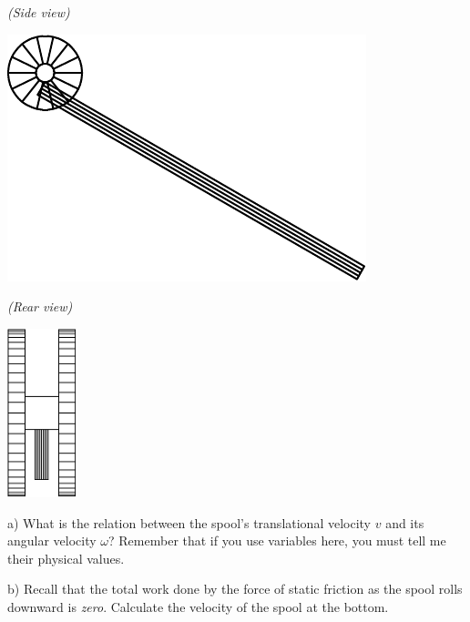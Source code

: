 \documentclass[12pt]{article}
\newcommand{\BC}{\begin{center}}
\newcommand{\EC}{\end{center}}
\begin{document}
\begin{minipage}{0.2\textwidth}
	\BC
	\it (Side view)
	
	\includegraphics[width=\textwidth]{sideview-crop.pdf}
	\EC
\end{minipage}
\begin{minipage}{0.3\textwidth}
	\BC
	\it (Rear view)
	
	\vspace{1cm}
	
	\includegraphics[width=0.15\textwidth]{rearview-crop.pdf}
	\EC
\end{minipage}
\begin{minipage}{0.5\textwidth}

a) What is the relation between the spool's translational velocity $v$ and its angular velocity $\omega$? Remember that if you use variables here, you must tell
me their physical values.
	\vspace{1in}
	
\end{minipage}	
\vspace{0.3in}


b) Recall that the total work  done by the force of static friction as the spool rolls downward is {\it zero}. Calculate the velocity of the spool at the bottom.
\end{document}
